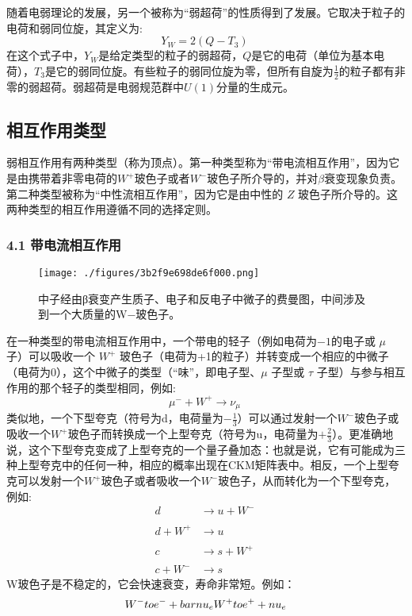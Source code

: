 随着电弱理论的发展，另一个被称为“弱超荷”的性质得到了发展。它取决于粒子的电荷和弱同位旋，其定义为:
$$Y_{W}=2(Q-T_{3})~$$
在这个式子中，$Y_{W}$是给定类型的粒子的弱超荷，$Q$是它的电荷（单位为基本电荷），$T_{3}$是它的弱同位旋。有些粒子的弱同位旋为零，但所有自旋为$\frac{1}{2}$的粒子都有非零的弱超荷。弱超荷是电弱规范群中$U(1)$分量的生成元。

\subsection{ 相互作用类型}
弱相互作用有两种类型（称为顶点）。第一种类型称为“带电流相互作用”，因为它是由携带着非零电荷的$W^{+}$玻色子或者$W^{-}$玻色子所介导的，并对$\beta$衰变现象负责。第二种类型被称为“中性流相互作用”，因为它是由中性的 $Z$ 玻色子所介导的。这两种类型的相互作用遵循不同的选择定则。

\subsubsection{4.1 带电流相互作用}
\begin{figure}[ht]
\centering
\texttt{[image: ./figures/3b2f9e698de6f000.png]}
\caption{中子经由β衰变产生质子、电子和反电子中微子的费曼图，中间涉及到一个大质量的W−玻色子。} \label{fig_RXHZY_6}
\end{figure}

在一种类型的带电流相互作用中，一个带电的轻子（例如电荷为$-1$的电子或 $\mu$ 子）可以吸收一个 $W^+$ 玻色子（电荷为+1的粒子）并转变成一个相应的中微子（电荷为$0$），这个中微子的类型（“味”，即电子型、$\mu$ 子型或 $\tau$ 子型）与参与相互作用的那个轻子的类型相同，例如:
$$\mu^- + W^+ \rightarrow \nu_\mu~$$
类似地，一个下型夸克（符号为d，电荷量为$-\frac{1}{3}$）可以通过发射一个$W^-$玻色子或吸收一个$W^+$玻色子而转换成一个上型夸克（符号为u，电荷量为$+\frac{2}{3}$）。更准确地说，这个下型夸克变成了上型夸克的一个量子叠加态：也就是说，它有可能成为三种上型夸克中的任何一种，相应的概率出现在CKM矩阵表中。相反，一个上型夸克可以发射一个$W^+$玻色子或者吸收一个$W^-$玻色子，从而转化为一个下型夸克，例如:
\begin{equation}
\begin{aligned}
d &\rightarrow u + W^{-} \\\\
d + W^{+} &\rightarrow u \\\\
c &\rightarrow s + W^{+} \\\\
c + W^{-} &\rightarrow s
\end{aligned}~
\end{equation}
W玻色子是不稳定的，它会快速衰变，寿命非常短。例如：
$$W^- \\to e^- + \\bar{\\nu}_e \\\\
W^+ \\to e^+ + \\nu_e$$


